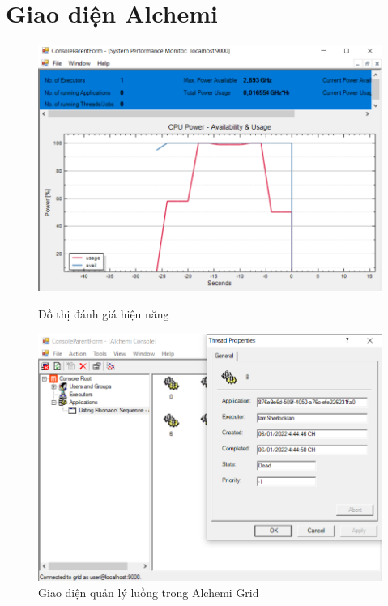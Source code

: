 \documentclass[12pt,a4paper]{report}
\begin{document}
\section{Giao diện Alchemi}
\begin{center}
    \begin{figure}[htp]
    \begin{center}
     	\includegraphics[scale=.6]{./Figures/FibonacciSequence/Graph}
     	\caption{Đồ thị đánh giá hiệu năng}
  
     	\includegraphics[scale=.6]{./Figures/FibonacciSequence/Manage}
    	\caption{Giao diện quản lý luồng trong Alchemi Grid}
    \end{center}
    \end{figure}
\end{center}
\end{document}
